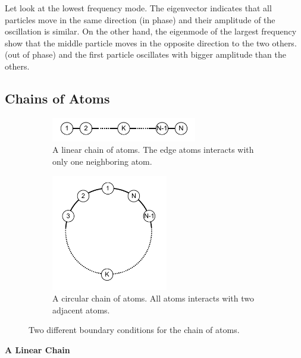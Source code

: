 {Let look at the lowest frequency mode.  The eigenvector indicates that all particles move in the same direction (in phase) and their amplitude of the oscillation is similar.  On the other hand, the eigenmode of the largest frequency show that the middle particle moves in the opposite direction to the two others. (out of phase) and the first particle oscillates with bigger amplitude than the others.

\noindent
\subsection{Chains of Atoms}

\begin{figure}
	\centering
	\begin{subfigure}{0.45\textwidth}
		\centering
		\includegraphics[width=2.5in]{10.matrix3/polymer_linear.pdf}
		\caption{A linear chain of atoms.  The edge atoms interacts with only one neighboring atom.}
		\raisebox{0.8in}{}
		\label{fig:polymer_linear}
	\end{subfigure}
	\begin{subfigure}{0.45\textwidth}
		\centering
		\includegraphics[width=2in]{10.matrix3/polymer_ring.pdf}
		\caption{A circular chain of atoms.  All atoms interacts with two adjacent atoms.}
		\label{fig:polymer_ring}
	\end{subfigure}
\caption{Two different boundary conditions for the chain of atoms.}\label{fig:polymer}
\end{figure}

\noindent
\textbf{A Linear Chain}

}
